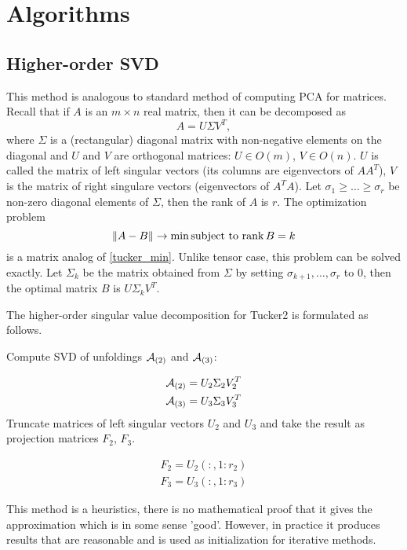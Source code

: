 \chapter{Algorithms}


\section{Higher-order SVD}
This method is analogous to standard method of computing PCA for matrices.
Recall that if $A$ is an $m \times n$ real matrix, then it can be decomposed as 
\begin{equation}
 A = U \Sigma V^T,
\end{equation}
where $\Sigma$ is a (rectangular) diagonal matrix with non-negative elements on the diagonal and $U$ and $V$ are orthogonal matrices: $U \in O(m)$, 
$V \in O(n)$. $U$ is called the matrix of left singular vectors (its columns are eigenvectors of $AA^T$), $V$ is the
matrix of right singulare vectors (eigenvectors of $A^TA$). Let $ \sigma_1 \geq \dots \geq \sigma_r$ be non-zero diagonal elements of $\Sigma$, then the rank of $A$ is $r$. The optimization problem
\begin{equation}
\| A - B \| \to \min \mbox{subject to $\operatorname*{rank} B = k $}
\end{equation}
is a matrix analog of \eqref{tucker_min}. Unlike tensor case, this problem can be solved exactly.
Let $\Sigma_k$ be  the matrix obtained from $\Sigma$ by setting $\sigma_{k+1}, \dots, \sigma_r$
to $0$, then the optimal matrix $B$ is $U \Sigma_k V^T$. 

The higher-order singular value decomposition for Tucker2 is formulated as follows.

Compute SVD of unfoldings $\mathcal{A}_{(2)}$ and $\mathcal{A}_{(3)}$:

\begin{eqnarray}
 \mathcal{A}_{(2)} = U_2 \Sigma_2 V_2^T  \\
 \mathcal{A}_{(3)} = U_3 \Sigma_3 V_3^T
\end{eqnarray}
Truncate matrices of left singular vectors $U_2$ and $U_3$ and take the result
as projection matrices $F_2$, $F_3$.

\begin{eqnarray}
F_2 = U_2(:, 1:r_2) \\
F_3= U_3(:, 1:r_3)
\end{eqnarray}

This method is a heuristics, there is no mathematical proof that it gives
the approximation which is in some sense 'good'. However, in practice it produces
results that are reasonable and is used as initialization for iterative methods.










